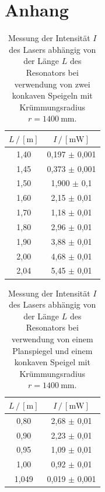 \newpage
\section{Anhang}
\label{sec:Anhang}






\begin{table}[H]
    
    \centering
    \caption{Messung der Intensität $I$ des Lasers abhängig von der Länge $L$ des Resonators bei verwendung von zwei konkaven Speigeln mit Krümmungsradius $r=\qty{1400}{\milli\meter}$.}
    \begin{tabular}{cc}
    \toprule
    $L \,/\, [\unit{\meter}]$ &
    $I \,/\, [\unit{\milli\watt}]$\\
    \midrule
    1,40 & 0,197 $\pm$  0,001 \\
    1,45 & 0,373 $\pm$  0,001 \\
    1,50 & 1,900 $\pm$  0,1   \\
    1,60 & 2,15  $\pm$  0,01  \\
    1,70 & 1,18  $\pm$  0,01  \\
    1,80 & 2,96  $\pm$  0,01  \\
    1,90 & 3,88  $\pm$  0,01  \\
    2,00 & 4,68  $\pm$  0,01  \\
    2,04 & 5,45  $\pm$  0,01  \\
    \bottomrule
    \end{tabular}
    \label{tab:konkon}
\end{table}



\begin{table}[H]
    
    \centering
    \caption{Messung der Intensität $I$ des Lasers abhängig von der Länge $L$ des Resonators bei verwendung von einem Planspiegel und einem konkaven Speigel mit Krümmungsradius $r=\qty{1400}{\milli\meter}$.}
    \begin{tabular}{cc}
    \toprule
    $L \,/\, [\unit{\meter}]$ &
    $I \,/\, [\unit{\milli\watt}]$\\
    \midrule
    0,80  &  2,68  $\pm$  0,01  \\
    0,90  &  2,23  $\pm$  0,01  \\
    0,95  &  1,09  $\pm$  0,01  \\
    1,00  &  0,92  $\pm$  0,01  \\
    1,049 &  0,019 $\pm$  0,001 \\
    \bottomrule
    \end{tabular}
    \label{tab:plankon}
\end{table}



